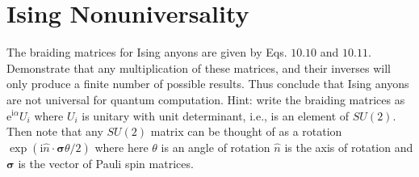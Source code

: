 
\section{Ising Nonuniversality}
The braiding matrices for Ising anyons are given by Eqs. $10.10$ and $10.11$. Demonstrate that any multiplication of these matrices, and their inverses will only produce a finite number of possible results. Thus conclude that Ising anyons are not universal for quantum computation. Hint: write the braiding matrices as $\mathrm{e}^{\mathrm{i} \alpha } U_{i}$ where $U_{i}$ is unitary with unit determinant, i.e., is an element of $SU(2)$. Then note that any $SU(2)$ matrix can be thought of as a rotation $\exp (\mathrm{i}\hat{n} \cdot \boldsymbol{\sigma } \theta /2)$ where here $\theta $ is an angle of rotation $\hat{n}$ is the axis of rotation and $\boldsymbol{\sigma }$ is the vector of Pauli spin matrices.

